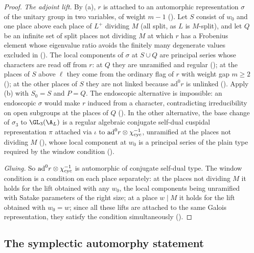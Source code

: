 \begin{proof}
\emph{The adjoint lift.} By (a), $r$ is attached to an automorphic representation $\sigma$ of the unitary group in two variables, of weight
$m-1$ (). Let $S$ consist of $w_0$ and one place above each place of $L^+$ dividing $M$ (all split, as
$L$ is $M$-split), and let $Q$ be an infinite set of split places not dividing $M$ at which $r$ has a Frobenius element whose eigenvalue ratio avoids the
finitely many degenerate values excluded in  (). The local components of $\sigma$ at $S\cup Q$ are principal series
whose characters are read off from $r$: at $Q$ they are unramified and regular
(); at the places of $S$ above $\ell$ they come from the ordinary flag of $r$ with weight gap
$m\ge2$ (); at the other places of $S$ they are not linked because
$\mathrm{ad}^0r$ is unlinked (). Apply (b) with $S_0=S$ and $P=Q$. The endoscopic
alternative is impossible: an endoscopic $\sigma$ would make $r$ induced from a character, contradicting irreducibility on open subgroups
at the places of $Q$ (). In the other alternative, the base change of
$\sigma_3$ to $\GL_3(\A_L)$ is a regular algebraic conjugate self-dual cuspidal representation $\pi$ attached via $\iota$ to
$\mathrm{ad}^0r\otimes\chi_{\mathrm{cyc}}^{-1}$, unramified at the places not dividing $M$
(), whose local component at $w_0$ is a principal series of the plain type required by the
window condition ().

\emph{Gluing.} So $\mathrm{ad}^0r\otimes\chi_{\mathrm{cyc}}^{-1}$ is automorphic of conjugate self-dual type. The window condition is a condition on each place
separately: at the places not dividing $M$ it holds for the lift obtained with any $w_0$, the local components being unramified with Satake
parameters of the right size; at a place $w\mid M$ it holds for the lift obtained with $w_0=w$; since all these lifts are attached to the same
Galois representation, they satisfy the condition simultaneously ().
\end{proof}
\subsection{The symplectic automorphy statement}\label{sec:pf:eis:sp}

